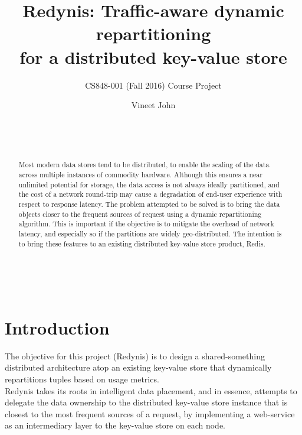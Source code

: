 \documentclass{sig-alternate}
\begin{document}
\title{Redynis: Traffic-aware dynamic repartitioning\\for a distributed key-value store}
\subtitle{CS848-001 (Fall 2016) Course Project}


\author{
	\alignauthor Vineet John\\
	\\
	\\
	\\
}


\maketitle
\begin{abstract}
Most modern data stores tend to be distributed, to enable the scaling of the data across multiple instances of commodity hardware. Although this ensures a near unlimited potential for storage, the data access is not always ideally partitioned, and the cost of a network round-trip may cause a degradation of end-user experience with respect to response latency. The problem attempted to be solved is to bring the data objects closer to the frequent sources of request using a dynamic repartitioning algorithm. This is important if the objective is to mitigate the overhead of network latency, and especially so if the partitions are widely geo-distributed. The intention is to bring these features to an existing distributed key-value store product, Redis\cite{redis-website}.\\
\end{abstract}


\\


\section{Introduction}
The objective for this project (Redynis) is to design a shared-something distributed architecture atop an existing key-value store that dynamically repartitions tuples based on usage metrics.\\

Redynis takes its roots in intelligent data placement, and in essence, attempts to delegate the data ownership to the distributed key-value store instance that is closest to the most frequent sources of a request, by implementing a web-service as an intermediary layer to the key-value store on each node.\\
\end{document}
